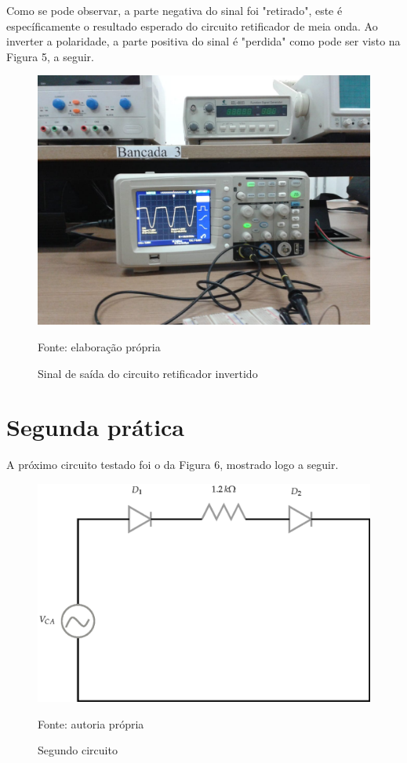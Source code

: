 \documentclass[
	12pt,				%
	openright,			%
	twoside,			%
	a4paper,			%
	article,	
	english,			%
	french,				%
	spanish,			%
	brazil				%
	]{abntex2}
\begin{document}
\par Como se pode observar, a parte negativa do sinal foi "retirado", este é específicamente o resultado esperado do circuito retificador de meia onda. Ao inverter a polaridade, a parte positiva do sinal é "perdida" como pode ser visto na Figura 5, a seguir.

\begin{figure}[H]\centering
\caption{Sinal de saída do circuito retificador invertido}
\includegraphics[scale=1.2,trim=13cm 10.5cm 21.5cm 15.3cm,clip]{waveform2.jpeg}

Fonte: elaboração própria
\end{figure}

\section{Segunda prática}
A próximo circuito testado foi o da Figura 6, mostrado logo a seguir.

\begin{figure}[H]\centering
\caption{Segundo circuito}
\includegraphics[trim=4cm 0 0 0, clip, scale=0.7]{ss.eps}

Fonte: autoria própria
\end{figure}
\end{document}
